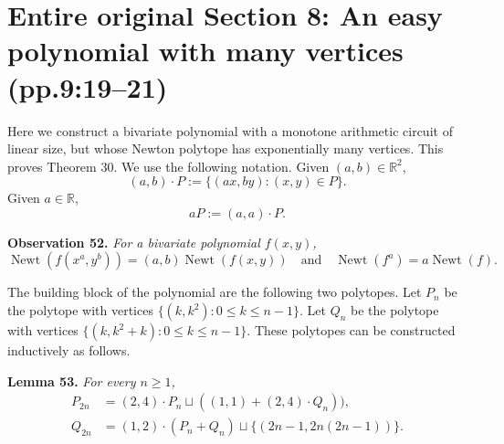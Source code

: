 \documentclass[10pt,a4paper]{article}
\newcommand{\Newt}{\operatorname{Newt}}
\newenvironment{sourceresult}[1]{\par\medskip\noindent\textbf{#1.}\itshape}{\par\medskip}
\begin{document}
\section*{Entire original Section 8: An easy polynomial with many vertices (pp.9:19--21)}
Here we construct a bivariate polynomial with a monotone arithmetic circuit of linear size, but whose Newton polytope has exponentially many vertices. This proves Theorem 30.
We use the following notation. Given $(a,b)\in\mathbb R^2$,
\[(a,b)\cdot P:=\{(ax,by):(x,y)\in P\}.\]
Given $a\in\mathbb R$,
\[aP:=(a,a)\cdot P.\]
\begin{sourceresult}{Observation 52}
For a bivariate polynomial $f(x,y)$,
\[\Newt(f(x^a,y^b))=(a,b)\Newt(f(x,y))\quad\text{and}\quad\Newt(f^a)=a\Newt(f).\]
\end{sourceresult}
The building block of the polynomial are the following two polytopes. Let $P_n$ be the polytope with vertices $\{(k,k^2):0\le k\le n-1\}$. Let $Q_n$ be the polytope with vertices $\{(k,k^2+k):0\le k\le n-1\}$. These polytopes can be constructed inductively as follows.
\begin{sourceresult}{Lemma 53}
For every $n\ge1$,
\begin{align}
P_{2n}&=(2,4)\cdot P_n\sqcup((1,1)+(2,4)\cdot Q_n)),\tag{8}\\
Q_{2n}&=(1,2)\cdot(P_n+Q_n)\sqcup\{(2n-1,2n(2n-1))\}.\tag{9}
\end{align}
\end{sourceresult}
\end{document}
